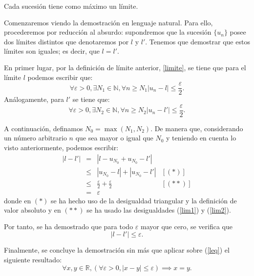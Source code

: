 \begin{teorema}
Cada sucesión tiene como máximo un límite.
\end{teorema}

\begin{demostracion}
  Comenzaremos viendo la demostración en lenguaje natural. Para ello,
  procederemos por reducción al absurdo: supondremos que la sucesión
  \(\{u_n\}\) posee dos límites distintos que denotaremos por \(l\)
  y \(l'\). Tenemos que demostrar que estos límites son iguales;
  es decir, que \(l=l'\).

  En primer lugar, por la definición de límite anterior, \ref{limite},
  se tiene que para el límite \(l\) podemos escribir que:
  \begin{equation}\label{lim1}
    ∀ ε > 0, ∃ N_1 ∈ ℕ, ∀ n ≥ N_1 |u_n-l| ≤ \frac{ε}{2}.
  \end{equation}
  Análogamente, para \(l'\) se tiene que:
  \begin{equation}\label{lim2}
    ∀ ε > 0, ∃ N_2 ∈ ℕ, ∀ n ≥ N_2 |u_n-l'| ≤ \frac{ε}{2}.
  \end{equation}


  A continuación, definamos \(N_0 = \max(N_1,N_2)\).
  De manera que, considerando un número arbitrario \(n\) que
  sea mayor o igual que \(N_0\) y teniendo en cuenta lo visto anteriormente,
  podemos escribir:
  \[\begin{array}{llll}
      |l-l'| &= &|l-u_{N_0}+u_{N_0}-l'|   & \\
             &≤ &|u_{N_0}-l|+|u_{N_0}-l'| & [(*)] \\
             &≤ &\frac{ε}{2}+\frac{ε}{2} & [(**)] \\
             &= &ε
  \end{array}\]
  donde en \((*)\) se ha hecho uso de la desigualdad triangular y la
  definición de valor absoluto y en \((**)\) se ha usado las
  desigualdades (\ref{lim1}) y (\ref{lim2}).

  Por tanto, se ha demostrado que para todo \(ε\) mayor que cero, se
  verifica que
  \begin{equation}\label{leq}
    |l-l'| ≤ ε.
  \end{equation}

  Finalmente, se concluye la demostración sin más que aplicar sobre
  (\ref{leq}) el siguiente resultado:
  \begin{equation}
    ∀ x, y ∈ ℝ, (∀ ε > 0, |x - y| ≤ ε) ⟹ x = y.
  \end{equation}
\end{demostracion}

